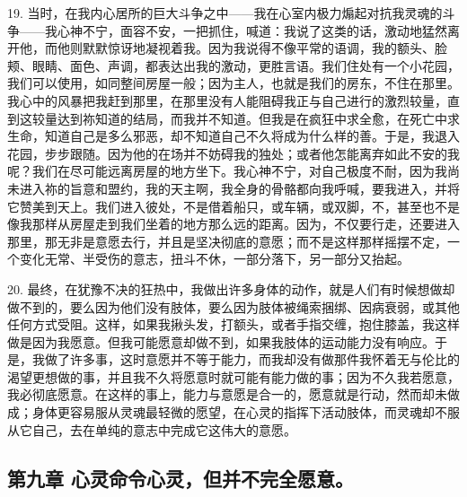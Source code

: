 19. 当时，在我内心居所的巨大斗争之中——我在心室内极力煽起对抗我灵魂的斗争——我心神不宁，面容不安，一把抓住，喊道：我说了这类的话，激动地猛然离开他，而他则默默惊讶地凝视着我。因为我说得不像平常的语调，我的额头、脸颊、眼睛、面色、声调，都表达出我的激动，更胜言语。我们住处有一个小花园，我们可以使用，如同整间房屋一般；因为主人，也就是我们的房东，不住在那里。我心中的风暴把我赶到那里，在那里没有人能阻碍我正与自己进行的激烈较量，直到这较量达到祢知道的结局，而我并不知道。但我是在疯狂中求全愈，在死亡中求生命，知道自己是多么邪恶，却不知道自己不久将成为什么样的善。于是，我退入花园，步步跟随。因为他的在场并不妨碍我的独处；或者他怎能离弃如此不安的我呢？我们在尽可能远离房屋的地方坐下。我心神不宁，对自己极度不耐，因为我尚未进入祢的旨意和盟约，我的天主啊，我全身的骨骼都向我呼喊，要我进入，并将它赞美到天上。我们进入彼处，不是借着船只，或车辆，或双脚，不，甚至也不是像我那样从房屋走到我们坐着的地方那么远的距离。因为，不仅要行走，还要进入那里，那无非是意愿去行，并且是坚决彻底的意愿；而不是这样那样摇摆不定，一个变化无常、半受伤的意志，扭斗不休，一部分落下，另一部分又抬起。\par

20. 最终，在犹豫不决的狂热中，我做出许多身体的动作，就是人们有时候想做却做不到的，要么因为他们没有肢体，要么因为肢体被绳索捆绑、因病衰弱，或其他任何方式受阻。这样，如果我揪头发，打额头，或者手指交缠，抱住膝盖，我这样做是因为我愿意。但我可能愿意却做不到，如果我肢体的运动能力没有响应。于是，我做了许多事，这时意愿并不等于能力，而我却没有做那件我怀着无与伦比的渴望更想做的事，并且我不久将愿意时就可能有能力做的事；因为不久我若愿意，我必彻底愿意。在这样的事上，能力与意愿是合一的，愿意就是行动，然而却未做成；身体更容易服从灵魂最轻微的愿望，在心灵的指挥下活动肢体，而灵魂却不服从它自己，去在单纯的意志中完成它这伟大的意愿。\par


\subsection{第九章 心灵命令心灵，但并不完全愿意。}

